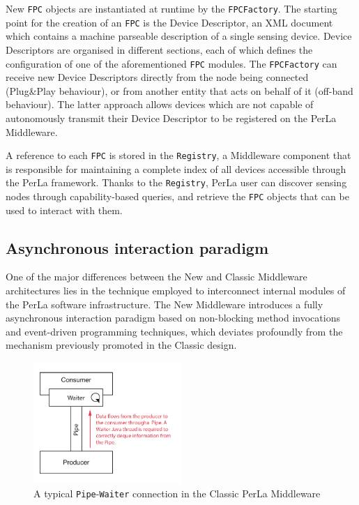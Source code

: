 New \texttt{FPC} objects are instantiated at runtime by the
\texttt{FPCFactory}. The starting point for the creation of an \texttt{FPC} is
the Device Descriptor, an XML document which contains a machine parseable
description of a single sensing device. Device Descriptors are organised in
different sections, each of which defines the configuration of one of the
aforementioned \texttt{FPC} modules. The \texttt{FPCFactory} can receive new
Device Descriptors directly from the node being connected (Plug\&Play
behaviour), or from another entity that acts on behalf of it (off-band
behaviour). The latter approach allows devices which are not capable of
autonomously transmit their Device Descriptor to be registered on the PerLa
Middleware.

A reference to each \texttt{FPC} is stored in the \texttt{Registry}, a
Middleware component that is responsible for maintaining a complete index of
all devices accessible through the PerLa framework. Thanks to the
\texttt{Registry}, PerLa user can discover sensing nodes through
capability-based queries, and retrieve the \texttt{FPC} objects that can be
used to interact with them.

\subsection{Asynchronous interaction paradigm}
\label{sec:newmiddleware.async}

One of the major differences between the New and Classic Middleware
architectures lies in the technique employed to interconnect internal modules
of the PerLa software infrastructure. The New Middleware introduces a fully
asynchronous interaction paradigm based on non-blocking method invocations and
event-driven programming techniques, which deviates profoundly from the
mechanism previously promoted in the Classic design.

\begin{figure}[h!]
    \center
    \includegraphics[width=0.5\textwidth]{imgs/pipe_waiter.pdf}
    \caption{A typical \texttt{Pipe}-\texttt{Waiter} connection in the Classic
        PerLa Middleware}
\end{figure}

